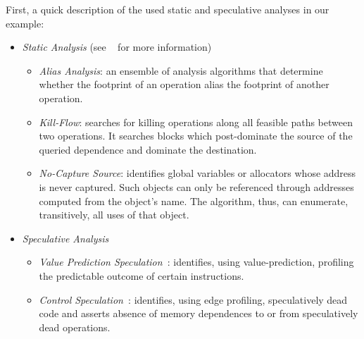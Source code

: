 First, a quick description of the used static and speculative analyses in our
example:
%
\begin{itemize}
%
\item \textit{Static Analysis} (see ~\cite{johnson:17:cgo} for more information)
%
  \begin{itemize}
%
  \item \textit{Alias Analysis}: an ensemble of analysis algorithms that
determine whether the footprint of an operation alias the footprint of another
operation.
%
  \item \textit{Kill-Flow}: searches for killing operations along all feasible
paths between two operations. It searches blocks which post-dominate the source
of the queried dependence and dominate the destination.
%
  \item \textit{No-Capture Source}: identifies global variables or allocators
whose address is never captured. Such objects can only be referenced through
addresses computed from the object's name. The algorithm, thus, can enumerate,
transitively, all uses of that object.
%
\end{itemize}
%
\item \textit{Speculative Analysis}
%
\begin{itemize}
%
  \item \textit{Value Prediction Speculation~\cite{}}: identifies, using
value-prediction, profiling the predictable outcome of certain instructions.
%
  \item \textit{Control Speculation~\cite{}}: identifies, using edge profiling,
speculatively dead code and asserts absence of memory dependences to or from
speculatively dead operations.
%
\end{itemize}
%
\end{itemize}
%

\lstset{basicstyle=\ttfamily, numbers=left, numberstyle=\tiny,
  stepnumber=1, numbersep=5pt}
\begin{figure}[t]
  \centering
  \scriptsize
  \subfloat[dijkstra]
  {
    \label{fig:dijkstra}
    \begin{minipage}{7.5cm}
      
    \end{minipage}
  }
\end{figure}

